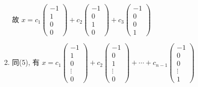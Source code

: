 \begin{enumerate}
			       故 \( x = c_{1}\begin{pmatrix}
				       -1 \\
				       1  \\
				       0  \\
				       0
			       \end{pmatrix} + c_{2}\begin{pmatrix}
				       -1 \\
				       0  \\
				       1  \\
				       0
			       \end{pmatrix} + c_{3}\begin{pmatrix}
				       -1 \\
				       0  \\
				       0  \\
				       1
			       \end{pmatrix} \)
			 \item %
			       同(5), 有 \( x = c_{1}\begin{pmatrix}
				       -1     \\
				       1      \\
				       0      \\
				       \vdots \\
				       0
			       \end{pmatrix} + c_{2}\begin{pmatrix}
				       -1     \\
				       0      \\
				       1      \\
				       \vdots \\
				       0
			       \end{pmatrix} + \cdots + c_{n-1}\begin{pmatrix}
				       -1     \\
				       0      \\
				       0      \\
				       \vdots \\
				       1
			       \end{pmatrix} \)
		 \end{enumerate}


